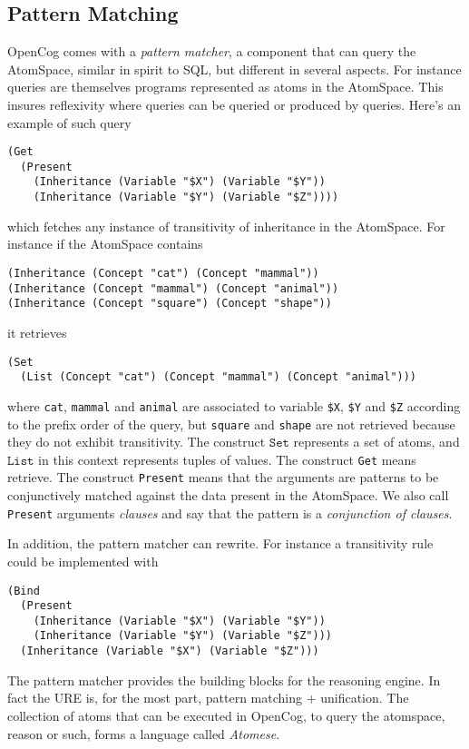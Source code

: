 \documentclass[runningheads]{llncs}
\begin{document}
\subsection{Pattern Matching}
\label{PM}

OpenCog comes with a \emph{pattern matcher}, a component that can
query the AtomSpace, similar in spirit to SQL, but different in
several aspects. For instance queries are themselves programs
represented as atoms in the AtomSpace. This insures reflexivity where
queries can be queried or produced by queries. Here's an example of
such query
\begin{verbatim}
(Get
  (Present
    (Inheritance (Variable "$X") (Variable "$Y"))
    (Inheritance (Variable "$Y") (Variable "$Z"))))
\end{verbatim}
which fetches any instance of transitivity of inheritance in the
AtomSpace. For instance if the AtomSpace contains
\begin{verbatim}
(Inheritance (Concept "cat") (Concept "mammal"))
(Inheritance (Concept "mammal") (Concept "animal"))
(Inheritance (Concept "square") (Concept "shape"))
\end{verbatim}
it retrieves
\begin{verbatim}
(Set
  (List (Concept "cat") (Concept "mammal") (Concept "animal")))
\end{verbatim}
where \texttt{cat}, \texttt{mammal} and \texttt{animal} are associated
to variable \texttt{\$X}, \texttt{\$Y} and \texttt{\$Z} according to
the prefix order of the query, but \texttt{square} and \texttt{shape}
are not retrieved because they do not exhibit transitivity. The
construct $\texttt{Set}$ represents a set of atoms, and
$\texttt{List}$ in this context represents tuples of values. The
construct \texttt{Get} means retrieve. The construct \texttt{Present}
means that the arguments are patterns to be conjunctively matched
against the data present in the AtomSpace. We also call
\texttt{Present} arguments \emph{clauses} and say that the pattern is
a \emph{conjunction of clauses}.

In addition, the pattern matcher can rewrite. For instance a
transitivity rule could be implemented with
\begin{verbatim}
(Bind
  (Present
    (Inheritance (Variable "$X") (Variable "$Y"))
    (Inheritance (Variable "$Y") (Variable "$Z")))
  (Inheritance (Variable "$X") (Variable "$Z")))
\end{verbatim}
The pattern matcher provides the building blocks for the reasoning
engine. In fact the URE is, for the most part, pattern matching +
unification. The collection of atoms that can be executed in OpenCog,
to query the atomspace, reason or such, forms a language called
\emph{Atomese}.
\end{document}
